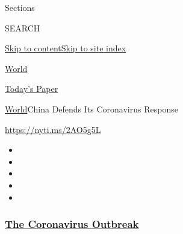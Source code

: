 Sections

SEARCH

\protect\hyperlink{site-content}{Skip to
content}\protect\hyperlink{site-index}{Skip to site index}

\href{https://www.nytimes3xbfgragh.onion/section/world}{World}

\href{https://myaccount.nytimes3xbfgragh.onion/auth/login?response_type=cookie\&client_id=vi}{}

\href{https://www.nytimes3xbfgragh.onion/section/todayspaper}{Today's
Paper}

\href{/section/world}{World}\textbar{}China Defends Its Coronavirus
Response

\url{https://nyti.ms/2AO5g5L}

\begin{itemize}
\item
\item
\item
\item
\item
\end{itemize}

\hypertarget{the-coronavirus-outbreak}{%
\subsubsection{\texorpdfstring{\href{https://www.nytimes3xbfgragh.onion/news-event/coronavirus?name=styln-coronavirus-national\&region=TOP_BANNER\&variant=undefined\&block=storyline_menu_recirc\&action=click\&pgtype=Article\&impression_id=a18de280-e384-11ea-a237-f96f036501c6}{The
Coronavirus
Outbreak}}{The Coronavirus Outbreak}}\label{the-coronavirus-outbreak}}

